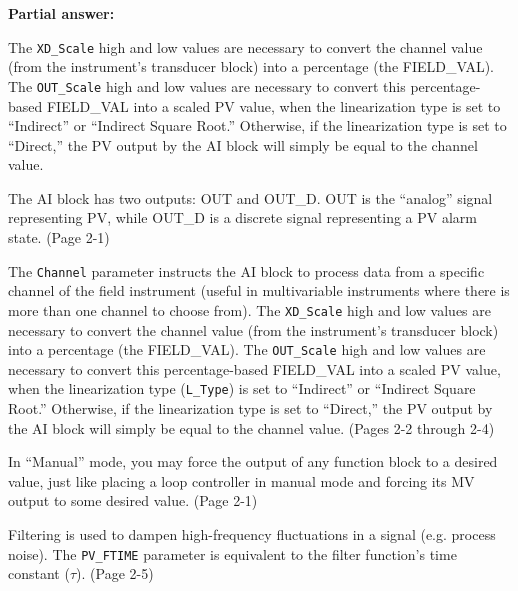 





\noindent
{\bf Partial answer:}

\vskip 10pt

The {\tt XD\_Scale} high and low values are necessary to convert the channel value (from the instrument's transducer block) into a percentage (the FIELD\_VAL).  The {\tt OUT\_Scale} high and low values are necessary to convert this percentage-based FIELD\_VAL into a scaled PV value, when the linearization type is set to ``Indirect'' or ``Indirect Square Root.''  Otherwise, if the linearization type is set to ``Direct,'' the PV output by the AI block will simply be equal to the channel value.







The AI block has two outputs: OUT and OUT\_D.  OUT is the ``analog'' signal representing PV, while OUT\_D is a discrete signal representing a PV alarm state.  (Page 2-1)

\vskip 10pt

The {\tt Channel} parameter instructs the AI block to process data from a specific channel of the field instrument (useful in multivariable instruments where there is more than one channel to choose from).  The {\tt XD\_Scale} high and low values are necessary to convert the channel value (from the instrument's transducer block) into a percentage (the FIELD\_VAL).  The {\tt OUT\_Scale} high and low values are necessary to convert this percentage-based FIELD\_VAL into a scaled PV value, when the linearization type ({\tt L\_Type}) is set to ``Indirect'' or ``Indirect Square Root.''  Otherwise, if the linearization type is set to ``Direct,'' the PV output by the AI block will simply be equal to the channel value.  (Pages 2-2 through 2-4)

\vskip 10pt

In ``Manual'' mode, you may force the output of any function block to a desired value, just like placing a loop controller in manual mode and forcing its MV output to some desired value.  (Page 2-1)

\vskip 10pt

Filtering is used to dampen high-frequency fluctuations in a signal (e.g. process noise).  The {\tt PV\_FTIME} parameter is equivalent to the filter function's time constant ($\tau$).  (Page 2-5)



